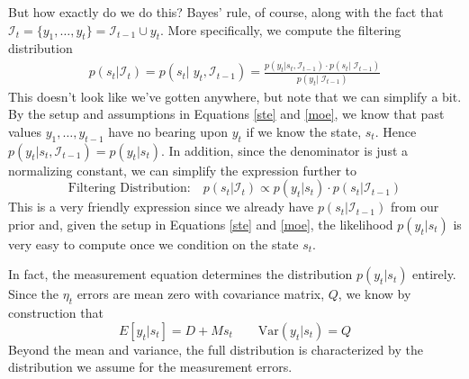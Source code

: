 \documentclass[a4paper,12pt]{article}
\begin{document}
But how exactly do we do this? Bayes' rule, of course, along with the fact that $\mathcal{I}_{t} = \{y_1, \ldots, y_t\}=\mathcal{I}_{t-1} \cup y_t$. More specifically, we compute the filtering distribution 
\begin{align*}
  p(s_t | \mathcal{I}_{t}) = 
  p(s_t | \; y_t, \mathcal{I}_{t-1}) = 
  \frac{
    p(y_t | s_t, \mathcal{I}_{t-1}) 
    \cdot p(s_t|\; \mathcal{I}_{t-1})
  }{p(y_t | \; \mathcal{I}_{t-1})}
\end{align*}
This doesn't look like we've gotten anywhere, but note that we can simplify a bit. By the setup and assumptions in Equations \ref{ste} and \ref{moe}, we know that past values $y_1, \ldots, y_{t-1}$ have no bearing upon $y_t$ if we know the state, $s_t$. Hence $p(y_t|s_t, \mathcal{I}_{t-1}) = p(y_t|s_t)$. In addition, since the denominator is just a normalizing constant, we can simplify the expression further to  
\begin{equation}
  \label{filt}
  \text{Filtering Distribution:} \quad
  p(s_t | \mathcal{I}_{t}) \propto p(y_t | s_t) \cdot 
  p(s_t |\mathcal{I}_{t-1})
\end{equation}
This is a very friendly expression since we already have $p(s_t | \mathcal{I}_{t-1})$ from our prior and, given the setup in Equations \ref{ste} and \ref{moe}, the likelihood $p(y_t|s_t)$ is very easy to compute once we condition on the state $s_t$.

In fact, the measurement equation determines the distribution $p(y_t|s_t)$ entirely. Since the $\eta_t$ errors are mean zero with covariance matrix, $Q$, we know by construction that
\[
  E[y_t|s_t] = D + M s_t 
  \qquad 
  \text{Var}(y_t|s_t) = Q
\]
Beyond the mean and variance, the full distribution is characterized by the distribution we assume for the measurement errors.
\end{document}
